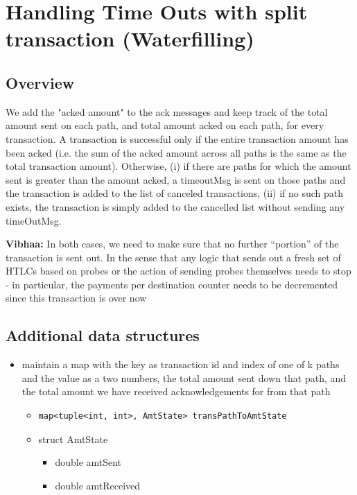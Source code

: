 \documentclass[a4paper]{article}
\newcommand{\vls}[1]{{\color{blue} \textbf{Vibhaa:} {#1}}}
\begin{document}
\section{Handling Time Outs with split transaction (Waterfilling)}
\subsection{Overview}
We add the "acked amount" to the ack messages and keep track of the total amount sent on each path, and total amount acked on each path, for every transaction. A transaction is successful only if the entire transaction amount has been acked (i.e. the sum of the acked amount across all paths is the same as the total transaction amount). Otherwise, (i) if there are paths for which the amount sent is greater than the amount acked, a timeoutMsg is sent on those paths and the transaction is added to the list of canceled transactions, (ii) if no such path exists, the transaction is simply added to the cancelled list without sending any timeOutMsg. 

\vls{In both cases, we need to make sure that no further ``portion'' of the transaction is sent out. In the sense that any logic that sends out a fresh set of HTLCs based on probes or the action of sending probes themselves needs to stop - in particular, the payments per destination counter needs to be decremented since this transaction is over now}

\subsection{Additional data structures}
\begin{itemize}
    \item maintain a map with the key as transaction id and index of one of k paths and the value as a two numbers, the total amount sent down that path, and the total amount we have received acknowledgements for from that path
    \begin{itemize}
        \item \begin{verbatim}map<tuple<int, int>, AmtState> transPathToAmtState \end{verbatim}
        \item struct AmtState
            \begin{itemize}
                \item double amtSent
                \item double amtReceived
            \end{itemize}
    \end{itemize}
\end{itemize}
\end{document}
